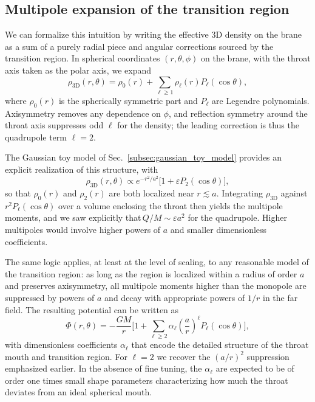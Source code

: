 \documentclass[12pt]{article}
\begin{document}
\subsection{Multipole expansion of the transition region}
\label{subsec:transition_multipoles}

We can formalize this intuition by writing the effective 3D density on the
brane as a sum of a purely radial piece and angular corrections sourced by
the transition region.  In spherical coordinates $(r,\theta,\phi)$ on the
brane, with the throat axis taken as the polar axis, we expand
\begin{equation}
  \rho_{\mathrm{3D}}(r,\theta)
  = \rho_0(r)
    + \sum_{\ell\ge 1} \rho_{\ell}(r) P_{\ell}(\cos\theta),
  \label{eq:rho3d_multipole}
\end{equation}
where $\rho_0(r)$ is the spherically symmetric part and
$P_{\ell}$ are Legendre polynomials.  Axisymmetry removes any dependence on
$\phi$, and reflection symmetry around the throat axis suppresses odd $\ell$
for the density; the leading correction is thus the quadrupole term
$\ell=2$.

The Gaussian toy model of Sec.~\ref{subsec:gaussian_toy_model} provides an
explicit realization of this structure, with
\begin{equation}
  \rho_{\mathrm{3D}}(r,\theta)
  \propto e^{-r^2/a^2}
          \Big[1 + \varepsilon P_2(\cos\theta)\Big],
\end{equation}
so that $\rho_0(r)$ and $\rho_2(r)$ are both localized near $r\lesssim a$.
Integrating $\rho_{\mathrm{3D}}$ against $r^2 P_{\ell}(\cos\theta)$ over a
volume enclosing the throat then yields the multipole moments, and we saw
explicitly that$\,$$Q/M\sim \varepsilon a^2$ for the quadrupole.  Higher
multipoles would involve higher powers of $a$ and smaller dimensionless
coefficients.

The same logic applies, at least at the level of scaling, to any reasonable
model of the transition region: as long as the region is localized within a
radius of order $a$ and preserves axisymmetry, all multipole moments higher
than the monopole are suppressed by powers of $a$ and decay with
appropriate powers of $1/r$ in the far field.  The resulting potential can
be written as
\begin{equation}
  \Phi(r,\theta)
  = -\frac{GM}{r}
    \Bigg[
      1
      + \sum_{\ell\ge 2}
          \alpha_{\ell}
          \left(\frac{a}{r}\right)^{\ell}
          P_{\ell}(\cos\theta)
    \Bigg],
  \label{eq:phi_multipole_general}
\end{equation}
with dimensionless coefficients $\alpha_{\ell}$ that encode the detailed
structure of the throat mouth and transition region.  For $\ell=2$ we
recover the $(a/r)^2$ suppression emphasized earlier.  In the absence of
fine tuning, the $\alpha_{\ell}$ are expected to be of order one times small
shape parameters characterizing how much the throat deviates from an ideal
spherical mouth.
\end{document}
